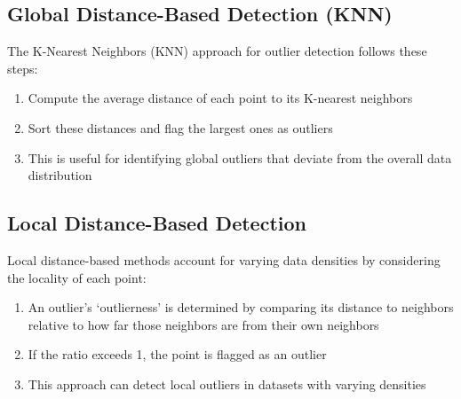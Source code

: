 \documentclass[
  letterpaper,
  DIV=11,
  numbers=noendperiod]{scrreprt}
\providecommand{\tightlist}{%
  \setlength{\itemsep}{0pt}\setlength{\parskip}{0pt}}\usepackage{longtable,booktabs,array}
\begin{document}
\subsection{Global Distance-Based Detection
(KNN)}\label{global-distance-based-detection-knn}

The K-Nearest Neighbors (KNN) approach for outlier detection follows
these steps:

\begin{enumerate}
\def\labelenumi{\arabic{enumi}.}
\tightlist
\item
  Compute the average distance of each point to its K-nearest neighbors
\item
  Sort these distances and flag the largest ones as outliers
\item
  This is useful for identifying global outliers that deviate from the
  overall data distribution
\end{enumerate}

\subsection{Local Distance-Based
Detection}\label{local-distance-based-detection}

Local distance-based methods account for varying data densities by
considering the locality of each point:

\begin{enumerate}
\def\labelenumi{\arabic{enumi}.}
\tightlist
\item
  An outlier's `outlierness' is determined by comparing its distance to
  neighbors relative to how far those neighbors are from their own
  neighbors
\item
  If the ratio exceeds 1, the point is flagged as an outlier
\item
  This approach can detect local outliers in datasets with varying
  densities
\end{enumerate}
\end{document}
